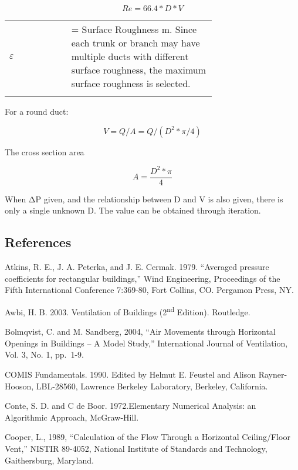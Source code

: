 \begin{equation}
Re = 66.4 *D *V
\end{equation}

\begin{tabular}{lp{0.7\linewidth}}
\\
 $\varepsilon$ &= Surface Roughness {m}. Since each trunk or branch may have multiple ducts with different surface roughness, the maximum surface roughness is selected.\\
\\
\end{tabular}

For a round duct:

\begin{equation}
V = Q/A = Q / (D^2 * \pi / 4)
\end{equation}

The cross section area

\begin{equation}
A = \frac{D^2 * \pi}{4}
\end{equation}

When ΔP given, and the relationship between D and V is also given, there is only a single unknown D. The value can be obtained through iteration. 

\subsection{References}\label{afn-references}

Atkins, R. E., J. A. Peterka, and J. E. Cermak. 1979. ``Averaged pressure coefficients for rectangular buildings,'' Wind Engineering, Proceedings of the Fifth International Conference 7:369-80, Fort Collins, CO. Pergamon Press, NY.

Awbi, H. B. 2003. Ventilation of Buildings (2\textsuperscript{nd} Edition). Routledge.

Bolmqvist, C. and M. Sandberg, 2004, ``Air Movements through Horizontal Openings in Buildings -- A Model Study,'' International Journal of Ventilation, Vol. 3, No. 1, pp.~1-9.

COMIS Fundamentals. 1990. Edited by Helmut E. Feustel and Alison Rayner-Hooson, LBL-28560, Lawrence Berkeley Laboratory, Berkeley, California.

Conte, S. D. and C de Boor. 1972.Elementary Numerical Analysis: an Algorithmic Approach, McGraw-Hill.

Cooper, L., 1989, ``Calculation of the Flow Through a Horizontal Ceiling/Floor Vent,'' NISTIR 89-4052, National Institute of Standards and Technology, Gaithersburg, Maryland.

